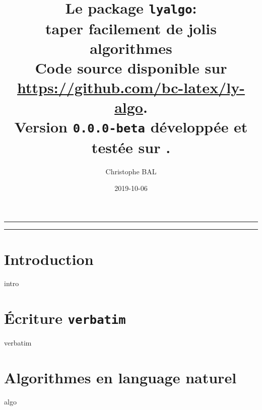\documentclass[12pt,a4paper]{article}
\begin{document}
\title{%
	Le package \texttt{lyalgo}:
	\\
	taper facilement de jolis algorithmes
	\\
	{
		\footnotesize Code source disponible
		sur \url{https://github.com/bc-latex/ly-algo}.%
	}
	\\
	{
		\footnotesize Version \texttt{0.0.0-beta}
		développée et testée sur \macosxname{}.%
	}
}

\author{Christophe BAL}
\date{2019-10-06}

\maketitle


\vspace{2em}

\hrule

\tableofcontents

\vspace{1.5em}

\hrule

\newpage





\section{Introduction}

{intro}







\section{Écriture \texttt{verbatim}}

{verbatim}




\section{Algorithmes en language naturel}

{algo}




%
\end{document}
